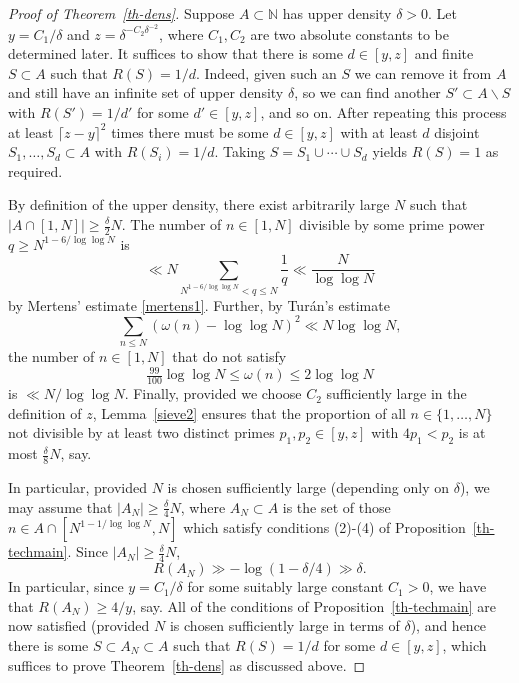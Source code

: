 \documentclass[12pt]{amsart}
\newcommand{\bbn}{\mathbb{N}}
\newcommand{\abs}[1]{\left\lvert #1\right\rvert}
\begin{document}
\begin{proof}[Proof of Theorem~\ref{th-dens}]
Suppose $A\subset \bbn$ has upper density $\delta>0$. Let $y=C_1/\delta$ and $z=\delta^{-C_2\delta^{-2}}$, where $C_1,C_2$ are two absolute constants to be determined later. It suffices to show that there is some $d\in [y,z]$ and finite $S\subset A$ such that $R(S)=1/d$. Indeed, given such an $S$ we can remove it from $A$ and still have an infinite set of upper density $\delta$, so we can find another $S'\subset A\backslash S$ with $R(S')=1/d'$ for some $d'\in [y,z]$, and so on. After repeating this process at least $\lceil z-y\rceil^2$ times there must be some $d\in [y,z]$ with at least $d$ disjoint $S_1,\ldots,S_d\subset A$ with $R(S_i)=1/d$. Taking $S=S_1\cup\cdots \cup S_d$ yields $R(S)=1$ as required.

By definition of the upper density, there exist arbitrarily large $N$ such that $\abs{A\cap [1,N]}\geq \frac{\delta}{2}N$. The number of $n\in [1,N]$ divisible by some prime power $q\geq N^{1-6/\log\log N}$ is
\[\ll N \sum_{N^{1-6/\log\log N}<q\leq N}\frac{1}{q}\ll \frac{N}{\log\log N}\]
by Mertens' estimate \eqref{mertens1}. Further, by Tur\'{a}n's estimate
\[\sum_{n\leq N}(\omega(n)-\log\log N)^2 \ll N \log\log N,\]
the number of $n\in [1,N]$ that do not satisfy 
\begin{equation}\label{divs}
\tfrac{99}{100}\log\log N\leq \omega(n) \leq 2\log\log N
\end{equation}
is $\ll N/\log\log N$. Finally, provided we choose $C_2$ sufficiently large in the definition of $z$, Lemma~\ref{sieve2} ensures that the proportion of all $n\in \{1,\ldots,N\}$ not divisible by at least two distinct primes $p_1,p_2\in [y,z]$ with $4p_1<p_2$ is at most $\frac{\delta}{8}N$, say. 

In particular, provided $N$ is chosen sufficiently large (depending only on $\delta$), we may assume that $\abs{A_N}\geq \frac{\delta}{4}N$, where $A_N\subset A$ is the set of those $n\in A\cap [N^{1-1/\log\log N},N]$ which satisfy conditions (2)-(4) of Proposition~\ref{th-techmain}. Since $\abs{A_N}\geq \frac{\delta}{4}N$, 
\[R(A_N) \gg -\log(1-\delta/4)\gg \delta.\]
In particular, since $y=C_1/\delta$ for some suitably large constant $C_1>0$, we have that $R(A_N)\geq 4/y$, say. All of the conditions of Proposition~\ref{th-techmain} are now satisfied (provided $N$ is chosen sufficiently large in terms of $\delta$), and hence there is some $S\subset A_N\subset A$ such that $R(S)=1/d$ for some $d\in [y,z]$, which suffices to prove Theorem~\ref{th-dens} as discussed above. 
\end{proof}
\end{document}

